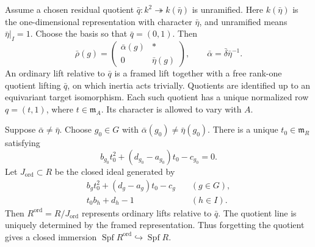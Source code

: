 Assume a chosen residual quotient
$\bar q:k^2\twoheadrightarrow k(\bar\eta)$ is unramified.
Here $k(\bar\eta)$ is the one-dimensional representation with
character $\bar\eta$, and unramified means $\bar\eta|_I=1$.
Choose the basis so that $\bar q=(0,1)$.
Then
\[
 \bar\rho(g)=
 \begin{pmatrix}\bar\alpha(g)&*\\0&\bar\eta(g)\end{pmatrix},
 \qquad \bar\alpha=\bar\delta\bar\eta^{-1}.
\]
An ordinary lift relative to $\bar q$ is a framed lift together with
a free rank-one quotient lifting $\bar q$, on which inertia acts
trivially. Quotients are identified up to an equivariant target
isomorphism. Each such quotient has a unique normalized row
$q=(t,1)$, where $t\in\mathfrak m_A$.
Its character is allowed to vary with $A$.

\begin{proposition}
\label{v4-arith:ordinary-local:equations}
Suppose $\bar\alpha\ne\bar\eta$. Choose $g_0\in G$ with
$\bar\alpha(g_0)\ne\bar\eta(g_0)$.
There is a unique $t_0\in\mathfrak m_R$ satisfying
\begin{equation}
\label{v4-arith:ordinary-local:hensel}
 b_{g_0}t_0^2+(d_{g_0}-a_{g_0})t_0-c_{g_0}=0.
\end{equation}
Let $J_{\mathrm{ord}}\subset R$ be the closed ideal generated by
\[
 \begin{split}
 b_gt_0^2+(d_g-a_g)t_0-c_g&\quad(g\in G),\\
 t_0b_h+d_h-1&\quad(h\in I).
 \end{split}
\]
Then $R^{\mathrm{ord}}=R/J_{\mathrm{ord}}$ represents ordinary
lifts relative to $\bar q$. The quotient line is uniquely determined
by the framed representation. Thus forgetting the quotient gives
a closed immersion
$\operatorname{Spf}R^{\mathrm{ord}}\hookrightarrow\operatorname{Spf}R$.
\end{proposition}

